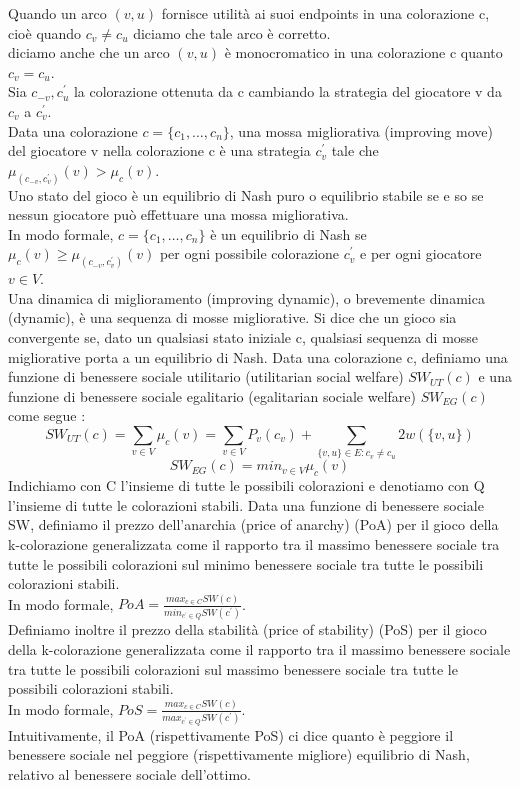 Quando un arco \((v, u)\) fornisce utilità ai suoi endpoints in una colorazione c, cioè quando \(c_v \neq c_u\) diciamo che tale arco è corretto.\\
diciamo anche che un arco \((v, u)\) è monocromatico in una colorazione c quanto \(c_v = c_u\).\\
Sia \(c_{-v}, c_u^{\prime}\) la colorazione ottenuta da c cambiando la strategia del giocatore v da \(c_v\) a \(c_v^{\prime}\).\\
Data una colorazione \(c = \{c_1,\ldots,c_n\}\), una mossa migliorativa (improving move) del giocatore v nella colorazione c è una strategia \(c_v^{\prime}\) tale che \(\mu_{(c_{-v}, c_v^{\prime})} (v) > \mu_c (v)\).\\
Uno stato del gioco è un equilibrio di Nash puro o equilibrio stabile se e so se nessun giocatore può effettuare una mossa migliorativa.\\
In modo formale, \(c = \{c_1,\ldots,c_n\}\) è un equilibrio di Nash se \(\mu_c (v) \geq \mu_{(c_{-v}, c_v^{\prime})} (v)\) per ogni possibile colorazione \(c_v^{\prime}\) e per ogni giocatore \(v \in V\).\\
Una dinamica di miglioramento (improving dynamic), o brevemente dinamica (dynamic), è una sequenza di mosse migliorative. Si dice che un gioco sia convergente se, dato un qualsiasi stato iniziale c, qualsiasi sequenza di mosse migliorative porta a un equilibrio di Nash.\newline
Data una colorazione c, definiamo una funzione di benessere sociale utilitario (utilitarian social welfare) \(SW_{UT}(c)\) e una funzione di benessere sociale egalitario (egalitarian sociale welfare) \(SW_{EG}(c)\) come segue :
\[SW_{UT} (c) = \sum_{v \in V} \mu_c (v) = \sum_{v \in V} P_v(c_v) + \sum_{\{v, u\} \in E : c_v \neq c_u} 2w(\{v, u\})\]
\[SW_{EG} (c) = min_{v \in V} \mu_c (v)\]
Indichiamo con C l'insieme di tutte le possibili colorazioni e denotiamo con Q l'insieme di tutte le colorazioni stabili. Data una funzione di benessere sociale SW, definiamo il prezzo dell'anarchia (price of anarchy) (PoA) per il gioco della k-colorazione generalizzata come il rapporto tra il massimo benessere sociale tra tutte le possibili colorazioni sul minimo benessere sociale tra tutte le possibili colorazioni stabili.\\
In modo formale, \(PoA = \frac{max_{c \in C} SW(c)}{min_{c^{\prime} \in Q} SW(c^{\prime})}\).\\
Definiamo inoltre il prezzo della stabilità (price of stability) (PoS) per il gioco della k-colorazione generalizzata come il rapporto tra il massimo benessere sociale tra tutte le possibili colorazioni sul massimo benessere sociale tra tutte le possibili colorazioni stabili.\\
In modo formale, \(PoS = \frac{max_{c \in C} SW(c)}{max_{c^{\prime} \in Q} SW(c^{\prime})}\).\\
Intuitivamente, il PoA (rispettivamente PoS) ci dice quanto è peggiore il benessere sociale nel peggiore (rispettivamente migliore) equilibrio di Nash, relativo al benessere sociale dell'ottimo.\\

